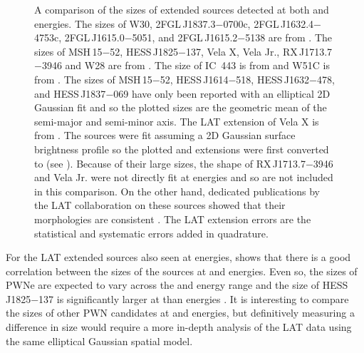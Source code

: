 \begin{figure}[htbp]
      \fi
    \caption{
    A comparison of the sizes of extended sources detected at
    both \gev and \tev energies.  The \tev sizes of W30,
    2FGL\,J1837.3$-$0700c, 2FGL\,J1632.4$-$4753c, 2FGL\,J1615.0$-$5051,
    and 2FGL\,J1615.2$-$5138 are from \cite{aharonian_2006a_h.e.s.s.-survey}.
    The \tev sizes of MSH\,15$-$52, HESS\,J1825$-$137,
    Vela X, Vela Jr., RX\,J1713.7$-$3946 and W28 are from
    \cite{aharonian_2005a_discovery-extended,aharonian_2006a_energy-dependent,aharonian_2006a_first-detection,aharonian_2007a_h.e.s.s.-observations,aharonian_2007a_primary-particle,aharonian_2008a_discovery-energy}.
    The \tev size of IC~443 is from \cite{acciari_2009a_observation-extended} and
    W51C is from \cite{krause_2011a_probing-proton}.  The \tev
    sizes of MSH\,15$-$52, HESS\,J1614$-$518, HESS\,J1632$-$478, and
    HESS\,J1837$-$069 have only been reported with an elliptical 2D
    Gaussian fit and so the plotted sizes are the geometric 
    mean of the semi-major and semi-minor axis.
    The LAT extension of
    Vela X is from \cite{abdo_2010c_fermi-large}. 
    The \tev sources were fit assuming a 2D Gaussian surface brightness profile
    so the plotted \gev and \tev extensions were first converted to
    \rsixeight (see ).  
    Because of
    their large sizes, the shape of RX\,J1713.7$-$3946 and Vela Jr.
    were not directly fit at \tev energies and so are not included
    in this comparison. On the other hand, dedicated publications by the 
    LAT collaboration on
    these sources showed that their morphologies are consistent
    \citep{abdo_2011a_observations-young,tanaka_2011a_gamma-ray-observations}.
    The LAT
    extension errors are the statistical and systematic errors added
    in quadrature. 
}
  \end{figure}

For the LAT extended sources also seen at \tev energies,
 shows that there is a good correlation
between the sizes of the sources at \gev and \tev energies. Even so,
the sizes of PWNe are expected to vary across the \gev and \tev energy
range and the size of HESS\,J1825$-$137 is significantly larger at
\gev than \tev energies \citep{grondin_2011a_detection-pulsar}.  It is interesting
to compare the sizes of other PWN candidates at \gev and \tev energies,
but definitively measuring a difference in size would require a more in-depth analysis
of the LAT data using the same elliptical Gaussian spatial model.


